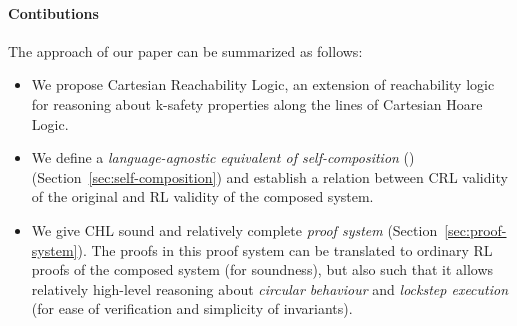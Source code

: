 \paragraph{Contibutions} The approach of our paper can be summarized as follows:
\begin{itemize}
\item We propose Cartesian Reachability Logic, an extension of reachability
  logic for reasoning about k-safety properties along the lines of Cartesian
  Hoare Logic.
\item We define a \emph{language-agnostic equivalent of self-composition}
  (\cite{BartheDR11}) (Section~\ref{sec:self-composition}) and establish a relation between CRL validity of the
  original and RL validity of the composed system.
\item We give CHL sound and relatively complete \emph{proof system}
  (Section~\ref{sec:proof-system}). The proofs in this proof system can be
  translated to ordinary RL proofs of the composed system (for soundness), but
  also such that it allows relatively high-level reasoning about
  \emph{circular behaviour} and \emph{lockstep execution} (for ease of
  verification and simplicity of invariants).
\end{itemize}



